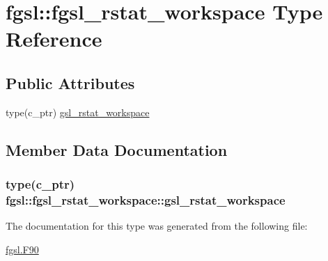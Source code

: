 \hypertarget{structfgsl_1_1fgsl__rstat__workspace}{}\section{fgsl\+:\+:fgsl\+\_\+rstat\+\_\+workspace Type Reference}
\label{structfgsl_1_1fgsl__rstat__workspace}
\subsection*{Public Attributes}
\begin{DoxyCompactItemize}
\item 
type(c\+\_\+ptr) \hyperlink{structfgsl_1_1fgsl__rstat__workspace_a48e5495674f98f3b03063f47126a5971}{gsl\+\_\+rstat\+\_\+workspace}
\end{DoxyCompactItemize}


\subsection{Member Data Documentation}
\hypertarget{structfgsl_1_1fgsl__rstat__workspace_a48e5495674f98f3b03063f47126a5971}{}
\subsubsection[{gsl\+\_\+rstat\+\_\+workspace}]{\setlength{\rightskip}{0pt plus 5cm}type(c\+\_\+ptr) fgsl\+::fgsl\+\_\+rstat\+\_\+workspace\+::gsl\+\_\+rstat\+\_\+workspace}\label{structfgsl_1_1fgsl__rstat__workspace_a48e5495674f98f3b03063f47126a5971}


The documentation for this type was generated from the following file\+:\begin{DoxyCompactItemize}
\item 
\hyperlink{fgsl_8F90}{fgsl.\+F90}\end{DoxyCompactItemize}
